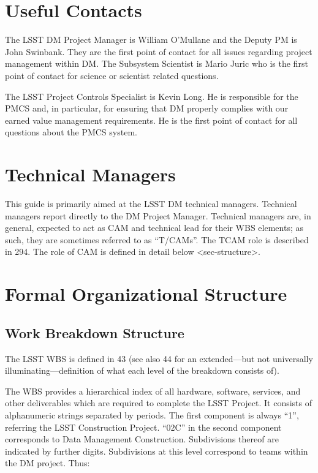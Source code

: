 \section{Useful Contacts}\label{useful-contacts}

The LSST DM Project Manager is William O'Mullane and the Deputy PM is
John Swinbank. They are the first point of contact for all issues
regarding project management within DM. The Subsystem Scientist is Mario
Juric who is the first point of contact for science or scientist related
questions.

The LSST Project Controls Specialist is Kevin Long. He is responsible
for the PMCS and, in particular, for ensuring that DM properly complies
with our earned value management requirements. He is the first point of
contact for all questions about the PMCS system.

\section{Technical Managers}\label{technical-managers}

This guide is primarily aimed at the LSST DM technical managers.
Technical managers report directly to the DM Project Manager. Technical
managers are, in general, expected to act as CAM and technical lead for
their WBS elements; as such, they are sometimes referred to as
``T/CAMs''. The TCAM role is described in 294. The role of CAM is
defined in detail below
\textless{}sec-structure\textgreater{}.

\section{Formal Organizational
Structure}\label{formal-organizational-structure}

\subsection{Work Breakdown Structure}\label{work-breakdown-structure}

The LSST WBS is defined in 43 (see also 44 for an extended---but not
universally illuminating---definition of what each level of the
breakdown consists of).

The WBS provides a hierarchical index of all hardware, software,
services, and other deliverables which are required to complete the LSST
Project. It consists of alphanumeric strings separated by periods. The
first component is always ``1'', referring the LSST Construction
Project. ``02C'' in the second component corresponds to Data Management
Construction. Subdivisions thereof are indicated by further digits.
Subdivisions at this level correspond to teams within the DM project.
Thus:

